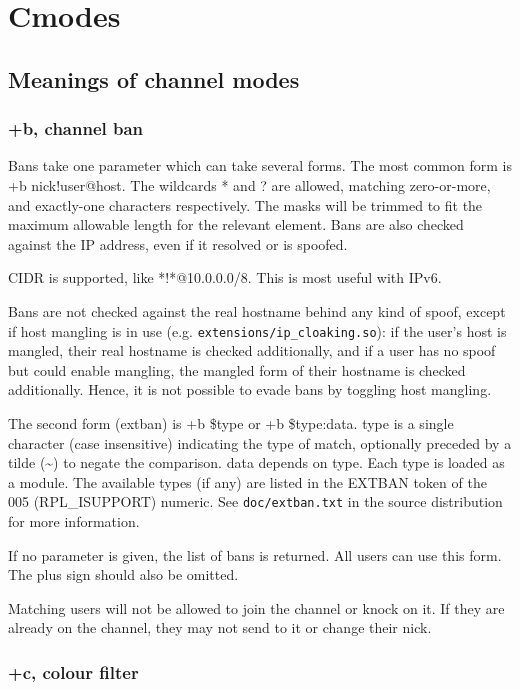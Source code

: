 \chapter{Cmodes}
\label{cmodes}

\section{Meanings of channel modes}

\subsection{+b, channel ban}

	Bans take one parameter which can take several forms. The most common
	form is +b nick!user@host. The wildcards * and ? are allowed, matching
	zero-{}or-{}more, and exactly-{}one characters respectively. The masks
	will be trimmed to fit the maximum allowable length for the relevant
	element. Bans are also checked against the IP address, even if it
	resolved or is spoofed.

	CIDR is supported, like *!*@10.0.0.0/8. This is most useful with
	IPv6.

	Bans are not checked against the real hostname behind any kind of
	spoof, except if host mangling is in use (e.g.
	\nolinkurl{extensions/ip_cloaking.so}): if the user's host is mangled,
	their real hostname is checked additionally, and if a user has no
	spoof but could enable mangling, the mangled form of their hostname is
	checked additionally. Hence, it is not possible to evade bans by
	toggling host mangling.

	The second form (extban) is +b \$type or +b \$type:data. type is a
	single character (case insensitive) indicating the type of match,
	optionally preceded by a tilde (\textasciitilde{}) to negate the
	comparison. data depends on type. Each type is loaded as a module. The
	available types (if any) are listed in the EXTBAN token of the 005
	(RPL\_ISUPPORT) numeric. See \nolinkurl{doc/extban.txt} in the source
	distribution for more information.


	If no parameter is given, the list of bans is returned. All users can
	use this form. The plus sign should also be omitted.


	Matching users will not be allowed to join the channel or knock on it.
	If they are already on the channel, they may not send to it or change
	their nick.


\subsection{+c, colour filter}

